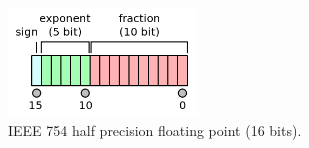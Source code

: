 \documentclass[logo,bsc,singlespacing,parskip]{infthesis}
\begin{document}
\begin{figure}
    \begin{center}
    \includegraphics[width=50mm,scale=0.1]{image/ieee-f16.png}
    \end{center}
    \caption{IEEE 754 half precision floating point (16 bits). \cite{ieee754-diagram}}
    \label{fig:ieee-f16}
\end{figure}












\end{document}
